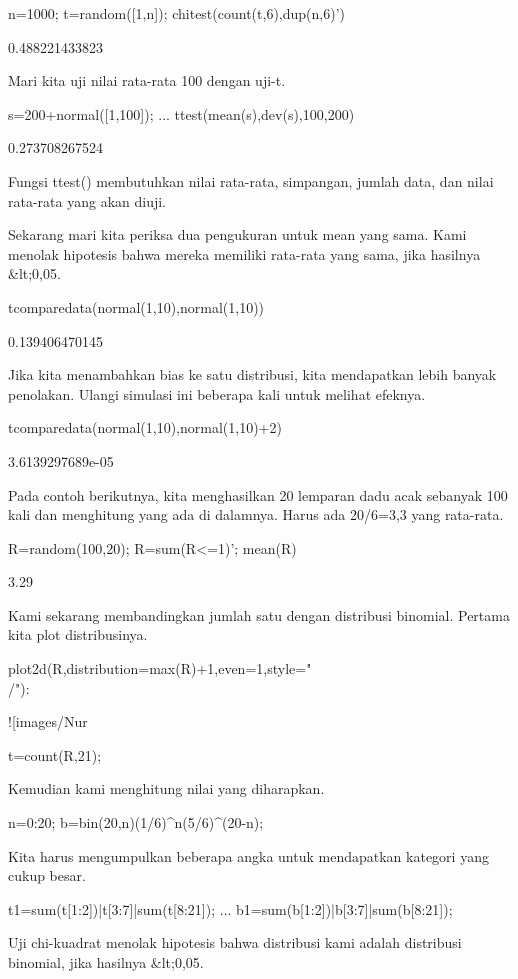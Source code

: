 \documentclass{article}
\begin{document}
\>n=1000; t=random([1,n]); chitest(count(t,6),dup(n,6)')


    0.488221433823

Mari kita uji nilai rata-rata 100 dengan uji-t.


\>s=200+normal([1,100]); ...  
\>   ttest(mean(s),dev(s),100,200)


    0.273708267524

Fungsi ttest() membutuhkan nilai rata-rata, simpangan, jumlah data,
dan nilai rata-rata yang akan diuji.


Sekarang mari kita periksa dua pengukuran untuk mean yang sama. Kami
menolak hipotesis bahwa mereka memiliki rata-rata yang sama, jika
hasilnya &lt;0,05.


\>tcomparedata(normal(1,10),normal(1,10))


    0.139406470145

Jika kita menambahkan bias ke satu distribusi, kita mendapatkan lebih
banyak penolakan. Ulangi simulasi ini beberapa kali untuk melihat
efeknya.


\>tcomparedata(normal(1,10),normal(1,10)+2)


    3.6139297689e-05

Pada contoh berikutnya, kita menghasilkan 20 lemparan dadu acak
sebanyak 100 kali dan menghitung yang ada di dalamnya. Harus ada
20/6=3,3 yang rata-rata.


\>R=random(100,20); R=sum(R<=1)'; mean(R)


    3.29

Kami sekarang membandingkan jumlah satu dengan distribusi binomial.
Pertama kita plot distribusinya.


\>plot2d(R,distribution=max(R)+1,even=1,style="\\/"):


![images/Nur%

\>t=count(R,21);


Kemudian kami menghitung nilai yang diharapkan.


\>n=0:20; b=bin(20,n)\*(1/6)^n\*(5/6)^(20-n);


Kita harus mengumpulkan beberapa angka untuk mendapatkan kategori yang
cukup besar.


\>t1=sum(t[1:2])|t[3:7]|sum(t[8:21]); ...  
\>   b1=sum(b[1:2])|b[3:7]|sum(b[8:21]);


Uji chi-kuadrat menolak hipotesis bahwa distribusi kami adalah
distribusi binomial, jika hasilnya &lt;0,05.
\end{document}

